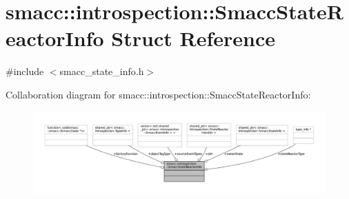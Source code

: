 \hypertarget{structsmacc_1_1introspection_1_1SmaccStateReactorInfo}{}\section{smacc\+:\+:introspection\+:\+:Smacc\+State\+Reactor\+Info Struct Reference}
\label{structsmacc_1_1introspection_1_1SmaccStateReactorInfo}


{\ttfamily \#include $<$smacc\+\_\+state\+\_\+info.\+h$>$}



Collaboration diagram for smacc\+:\+:introspection\+:\+:Smacc\+State\+Reactor\+Info\+:
\nopagebreak
\begin{figure}[H]
\begin{center}
\leavevmode
\includegraphics[width=350pt]{structsmacc_1_1introspection_1_1SmaccStateReactorInfo__coll__graph}
\end{center}
\end{figure}
